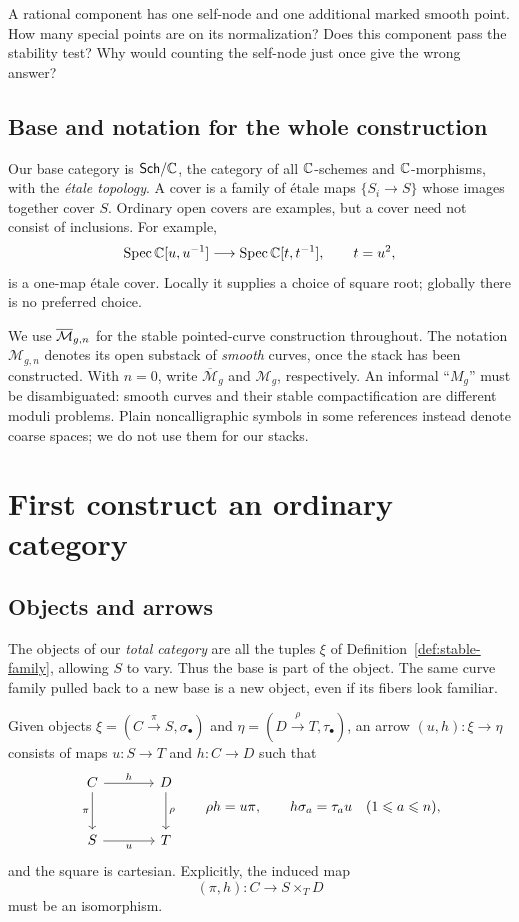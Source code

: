 \begin{Ej}\label{ex:stability-test}
A rational component has one self-node and one additional marked
smooth point. How many special points are on its normalization?
Does this component pass the stability test? Why would counting the
self-node just once give the wrong answer?
\end{Ej}

\subsection{Base and notation for the whole construction}

Our base category is $\mathsf{Sch}/\mathbb C$, the category of all $\mathbb C$-schemes
and $\mathbb C$-morphisms, with the \emph{\'etale topology}. A cover is a
family of \'etale maps $\{S_i\to S\}$ whose images together cover
$S$. Ordinary open covers are examples, but a cover need not consist
of inclusions. For example,
\[
\operatorname{Spec}\mathbb C[u,u^{-1}]\longrightarrow\operatorname{Spec}\mathbb C[t,t^{-1}],\qquad t=u^2,
\]
is a one-map \'etale cover. Locally it supplies a choice of square
root; globally there is no preferred choice.

We use $\overline{\mathcal M}_{g,n}$ for the stable pointed-curve construction throughout.
The notation $\mathcal M_{g,n}$ denotes its open substack of
\emph{smooth} curves, once the stack has been constructed. With
$n=0$, write $\overline{\mathcal M}_g$ and $\mathcal M_g$,
respectively. An informal ``$M_g$'' must be disambiguated: smooth
curves and their stable compactification are different moduli
problems. Plain noncalligraphic symbols in some references instead
denote coarse spaces; we do not use them for our stacks.

\section{First construct an ordinary category}\label{sec:curve-category}

\subsection{Objects and arrows}

The objects of our \emph{total category} are all the tuples $\xi$
of Definition~\ref{def:stable-family}, allowing $S$ to vary. Thus
the base is part of the object. The same curve family pulled back
to a new base is a new object, even if its fibers look familiar.

\begin{Def}\label{def:curve-arrow}
Given objects $\xi=(C\xrightarrow{\pi}S,\sigma_\bullet)$ and
$\eta=(D\xrightarrow{\rho}T,\tau_\bullet)$, an arrow
$(u,h):\xi\to\eta$ consists of maps $u:S\to T$ and $h:C\to D$
such that
\[
\begin{tikzcd}[row sep=large,column sep=large]
C\arrow[r,"h"]\arrow[d,"\pi"']&D\arrow[d,"\rho"]\\
S\arrow[r,"u"']&T
\end{tikzcd}
\qquad
\rho h=u\pi,\qquad h\sigma_a=\tau_a u\quad(1\leq a\leq n),
\]
and the square is cartesian. Explicitly, the induced map
\[
             (\pi,h):C\longrightarrow S\times_TD
\]
must be an isomorphism.
\end{Def}

